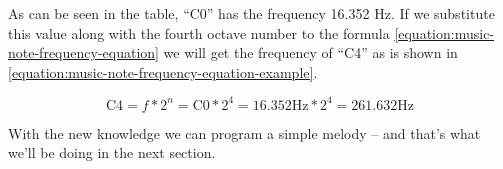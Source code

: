 \documentclass[../sparc.tex]{subfiles}
\begin{document}
As can be seen in the table, ``C0'' has the frequency 16.352 Hz.  If we
substitute this value along with the fourth octave number to the formula
\ref{equation:music-note-frequency-equation} we will get the frequency of ``C4''
as is shown in \ref{equation:music-note-frequency-equation-example}.

\begin{equation}
  \mbox{C4} = f * 2^n = \mbox{C0} * 2^4 = 16.352\mbox{Hz} * 2^4 = 261.632\mbox{Hz}
  \label{equation:music-note-frequency-equation-example}
\end{equation}

With the new knowledge we can program a simple melody -- and that's what we'll be
doing in the next section.
\end{document}
